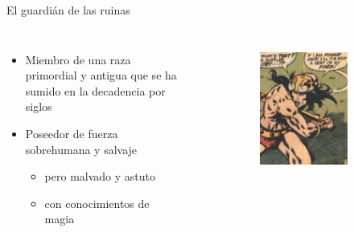 \begin{frame}{El guardián de las ruinas}
	\begin{columns}
		\begin{itemize}
			\item Miembro de una raza primordial y antigua que se ha sumido en la decadencia por siglos
			\item Poseedor de fuerza sobrehumana y salvaje
			\begin{itemize}
			   \item pero malvado y astuto
			   \item con conocimientos de magia
		    \end{itemize}
		\end{itemize}
		\begin{figure}[htp]
			\centering
			\begin{subfigure}[b]{0.3\textwidth}
				\includegraphics[width=\textwidth]{img/conan/CTB}
			\end{subfigure}

\end{figure}
\end{columns}
\end{frame}
